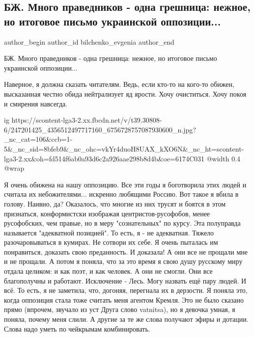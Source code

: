  
 
 
 
 
 
\subsection{БЖ. Много праведников - одна грешница: нежное, но итоговое письмо украинской оппозиции...}
\label{sec:19_10_2021.fb.bilchenko_evgenia.1.oppozicia_pismo}
 
\ifcmt
 author_begin
   author_id bilchenko_evgenia
 author_end
\fi

БЖ. Много праведников - одна грешница: нежное, но итоговое письмо украинской
оппозиции...

Наверное, я должна сказать читателям. Ведь, если кто-то на кого-то обижен,
высказанная честно обида нейтрализует яд ярости. Хочу очиститься. Хочу покоя и
смирения навсегда.

\ifcmt
  ig https://scontent-lga3-2.xx.fbcdn.net/v/t39.30808-6/247201425_4356512497717160_6756728757087930600_n.jpg?_nc_cat=106&ccb=1-5&_nc_sid=8bfeb9&_nc_ohc=vkYr4duoH8UAX_kXO6N&_nc_ht=scontent-lga3-2.xx&oh=fd514f6ab0a93d6c2a926aae298b8d4b&oe=6174C031
  @width 0.4
  @wrap 
\fi

Я очень обижена на нашу оппозицию. Все эти годы я боготворила этих людей и
считала их небожителями... искренно любящими Россию. Вот такое я вбила в
голову. Наивно, да? Оказалось, что многие из них трусят и боятся в этом
признаться, конформистски изображая центристов-русофобов, менее русофобских,
чем правые, но в меру "сознательных" по курсу. Эта полуправда называется
"адекватной позицией". То есть, я - не адекватная. Тяжело разочаровываться в
кумирах. Не сотвори их себе. Я очень пыталась им понравиться, доказать свою
преданность. И доказала! А они все не прощали мне и не прощали. А потом я
поняла, что за это время я свою душу русскому миру отдала целиком: и как поэт,
и как человек. А они не смогли. Они все благополучны и работают. Исключение -
Лесь. Могу назвать ещё пару людей. И всё. То есть, я не заметила, что, догоняя,
перегнала их в дерзости. Я поняла это, когда оппозиция стала тоже считать меня
агентом Кремля. Это не было сказано прямо (впрочем, звучало из уст Друга слово
vatnitsa), но я девочка умная, я поняла, почему меня слили. А другие за те же
слова получают эфиры и дотации. Слова надо уметь по чейкрымам комбинировать.

